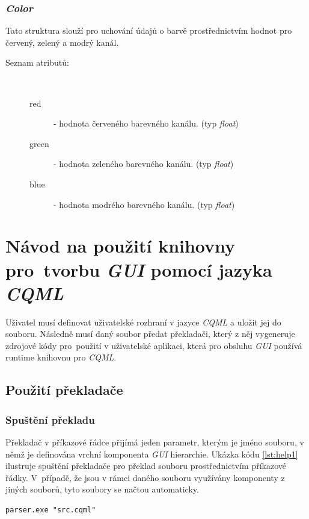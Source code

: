 \documentclass[11pt,twoside,a4paper]{book}
\begin{document}
\subsection{\textit{Color}}
Tato struktura slouží pro uchování údajů o barvě prostřednictvím hodnot pro červený, zelený a modrý kanál.\\
\begin{description}
\item[Seznam atributů:] ~
\begin{description}
\item[red] - hodnota červeného barevného kanálu. (typ \textit{float})
\item[green] - hodnota zeleného barevného kanálu. (typ \textit{float})
\item[blue] - hodnota modrého barevného kanálu. (typ \textit{float})
\end{description}
\end{description}




\chapter[Návod na použití \textit{CQML}]{\label{CH:APD}Návod na použití knihovny pro~tvorbu \textit{GUI} pomocí jazyka \textit{CQML}}
Uživatel musí definovat uživatelské rozhraní v jazyce \textit{CQML} a uložit jej do souboru. Následně musí daný soubor předat překladači, který z něj vygeneruje zdrojové kódy pro~použití v uživatelské aplikaci, která pro obsluhu \textit{GUI} používá runtime knihovnu pro \textit{CQML}.
\section{Použití překladače}
\subsection{Spuštění překladu}
Překladač v příkazové řádce přijímá jeden parametr, kterým je jméno souboru, v němž je definována vrchní komponenta \textit{GUI} hierarchie. Ukázka kódu \ref{lst:help1} ilustruje spuštění překladače pro překlad souboru  prostřednictvím příkazové řádky. V~případě, že jsou v rámci daného souboru využívány komponenty z jiných souborů, tyto soubory se načtou automaticky.
\begin{lstlisting}[frame=single,caption=Spuštění překladače pomocí příkazové řádky.,label=lst:help1]
parser.exe "src.cqml"
\end{lstlisting}
\end{document}
